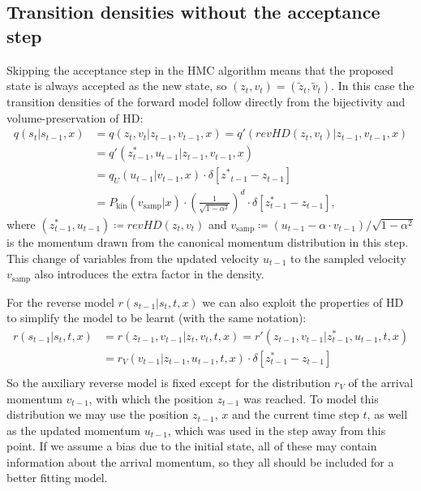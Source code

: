\documentclass[12pt]{scrartcl}
\begin{document}
\subsection{Transition densities without the acceptance step}
\label{sec:TransitionDensitiesNoAcceptance}
Skipping the acceptance step in the HMC algorithm means that the proposed state is always accepted as the new state, so $(z_t, v_t) = (\tilde{z}_t, \tilde{v}_t)$. In this case the transition densities of the forward model follow directly from the bijectivity and volume-preservation of HD:
\begin{equation} \label{eq:ForwardTransitionNoAcceptance}
\begin{split}
q(s_t|s_{t-1}, x) &= q(z_t, v_t| z_{t-1}, v_{t-1}, x) = q'(revHD(z_t, v_t)|z_{t-1}, v_{t-1}, x) \\
&= q'(z^*_{t-1}, u_{t-1} |z_{t-1}, v_{t-1}, x) \\
&= q_U(u_{t-1}|v_{t-1}, x) \cdot \delta[{z^*}_{t-1} - z_{t-1}] \\
&= P_\textrm{kin}(v_{\textrm{samp}}|x) \cdot (\frac{1}{\sqrt{1 - \alpha^2}})^{d} \cdot \delta[z^*_{t-1} - z_{t-1}],
\end{split}
\end{equation}
where $(z^*_{t-1}, u_{t-1}) \coloneqq revHD(z_t, v_t)$ and $v_{\textrm{samp}} \coloneqq (u_{t-1} - \alpha \cdot v_{t-1})/{\sqrt{1 - \alpha^2}}$ is the momentum drawn from the canonical momentum distribution in this step. This change of variables from the updated velocity $u_{t-1}$ to the sampled velocity $v_{\textrm{samp}}$ also introduces the extra factor in the density.

For the reverse model $r(s_{t-1}|s_t, t, x)$ we can also exploit the properties of HD to simplify the model to be learnt (with the same notation):
\begin{equation} \label{eq:ReverseTransitionNoAcceptance}
\begin{split}
r(s_{t-1}|s_{t}, t, x) &= r(z_{t-1}, v_{t-1}| z_t, v_t, t, x) = r'(z_{t-1}, v_{t-1} |z^*_{t-1}, u_{t-1},t , x) \\
&= r_V(v_{t-1}|z_{t-1}, u_{t-1}, t, x) \cdot \delta[z^*_{t-1} - z_{t-1}] \\
\end{split}
\end{equation}
So the auxiliary reverse model is fixed except for the distribution $r_V$ of the arrival momentum $v_{t-1}$, with which the position $z_{t-1}$ was reached. To model this distribution we may use the position $z_{t-1}$, $x$ and the current time step $t$, as well as the updated momentum $u_{t-1}$, which was used in the step away from this point. If we assume a bias due to the initial state, all of these may contain information about the arrival momentum, so they all should be included for a better fitting model.
\end{document}
